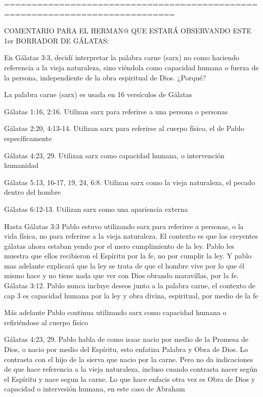 \documentclass[11a pt,twoside]{article}
\def\emph#1{#1}%
\begin{document}
\emph{=============================================================================}

\emph{COMENTARIO PARA EL HERMAN@ QUE ESTARÁ OBSERVANDO ESTE 1er BORRADOR
DE GÁLATAS:}

\emph{En Gálatas 3:3, decidí interpretar la palabra carne (sarx) no como
haciendo referencia a la vieja naturaleza, sino viéndola como capacidad
humana o fuerza de la persona, independiente de la obra espiritual de
Dios. ¿Porqué?}

\emph{La palabra carne (sarx) es usada en 16 versículos de Gálatas}

\emph{Gálatas 1:16, 2:16. Utilizan sarx para referirse a una persona o
personas}

\emph{Gálatas 2:20, 4:13-14. Utilizan sarx para referirse al cuerpo
físico, el de Pablo específicamente}

\emph{Gálatas 4:23, 29. Utilizan sarx como capacidad humana, o
intervención humanidad}

\emph{Gálatas 5:13, 16-17, 19, 24, 6:8. Utilizan sarx como la vieja
naturaleza, el pecado dentro del hombre}

\emph{Gálatas 6:12-13. Utilizan sarx como una apariencia externa}

\emph{Hasta Gálatas 3:3 Pablo estuvo utilizando sarx para referirse a
personas, o la vida física, no para referirse a la vieja naturaleza. El
contexto es que los creyentes gálatas ahora estaban yendo por el mero
cumplimiento de la ley. Pablo les muestra que ellos recibieron el
Espíritu por la fe, no por cumplir la ley. Y pablo mas adelante
explicará que la ley se trata de que el hombre vive por lo que él mismo
hace y no tiene nada que ver con Dios obrando maravillas, por la fe.
Gálatas 3:12. Pablo nunca incluye deseos junto a la palabra carne, el
contexto de cap 3 es capacidad humana por la ley y obra divina,
espiritual, por medio de la fe}

\emph{Más adelante Pablo continua utilizando sarx como capacidad humana
o refiriéndose al cuerpo físico}

\emph{Gálatas 4:23, 29. Pablo habla de como isaac nacio por medio de la
Promesa de Dios, o nacio por medio del Espíritu, esto enfatiza Palabra y
Obra de Dios. Lo contrasta con el hijo de la sierva que nacio por la
carne. Pero no da indicaciones de que hace referencia a la vieja
naturaleza, incluso cuando contrasta nacer según el Espíritu y nace
segun la carne. Lo que hace enfacis otra vez es Obra de Dios y capacidad
o intervesión humana, en este caso de Abraham}
\end{document}
